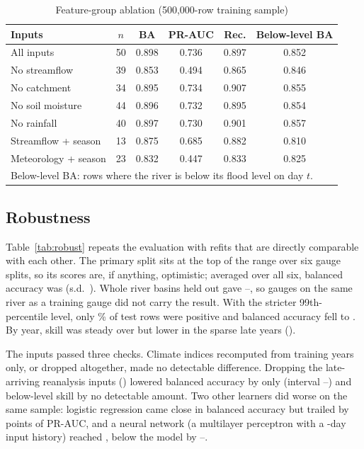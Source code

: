 \documentclass[conference]{IEEEtran}
\begin{document}
\begin{table}[t]
\caption{Feature-group ablation (500,000-row training sample)}
\label{tab:abl}
\centering
\footnotesize
\setlength{\tabcolsep}{3pt}
\begin{tabular}{lccccc}
\toprule
Inputs & $n$ & BA & PR-AUC & Rec. & Below-level BA\\
\midrule
All inputs & 50 & 0.898 & 0.736 & 0.897 & 0.852\\
No streamflow & 39 & 0.853 & 0.494 & 0.865 & 0.846\\
No catchment & 34 & 0.895 & 0.734 & 0.907 & 0.855\\
No soil moisture & 44 & 0.896 & 0.732 & 0.895 & 0.854\\
No rainfall & 40 & 0.897 & 0.730 & 0.901 & 0.857\\
Streamflow + season & 13 & 0.875 & 0.685 & 0.882 & 0.810\\
Meteorology + season & 23 & 0.832 & 0.447 & 0.833 & 0.825\\
\bottomrule
\multicolumn{6}{l}{\scriptsize Below-level BA: rows where the river is below its flood level on day $t$.}\\
\end{tabular}
\end{table}

\subsection{Robustness}
\label{sec:robust}
Table~\ref{tab:robust} repeats the evaluation with refits that are directly comparable with each other. The primary split sits at the top of the range over six gauge splits, so its scores are, if anything, optimistic; averaged over all six, balanced accuracy was \SplitBAMean{} (s.d.\ \SplitBASd). Whole river basins held out gave \BasinBAMin--\BasinBAMax, so gauges on the same river as a training gauge did not carry the result. With the stricter 99th-percentile level, only \QnnPrev\% of test rows were positive and balanced accuracy fell to \QnnBA. By year, skill was steady over \YearsBig{} but lower in the sparse late years (\YearLateBA).

The inputs passed three checks. Climate indices recomputed from training years only, or dropped altogether, made no detectable difference. Dropping the late-arriving reanalysis inputs (\RtLate) lowered balanced accuracy by only \RtDiff{} (interval \RtLo--\RtHi) and below-level skill by no detectable amount. Two other learners did worse on the same sample: logistic regression came close in balanced accuracy but trailed by \LrGainPR{} points of PR-AUC, and a neural network (a multilayer perceptron with a \MlpWin-day input history) reached \MlpBA, below the model by \MlpDiffLo--\MlpDiffHi.
\end{document}
